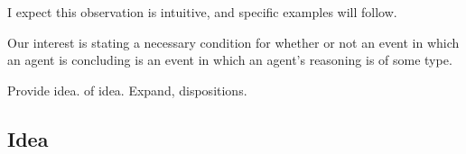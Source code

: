 \begin{note}
  I expect this observation is intuitive, and specific examples will follow.
\end{note}


\begin{note}
  Our interest is stating a necessary condition for whether or not an event in which an agent is concluding is an event in which an agent's reasoning is of some type.

  Provide idea.
   of idea.
  Expand, dispositions.
\end{note}


\subsection{Idea}
\label{sec:idea}

